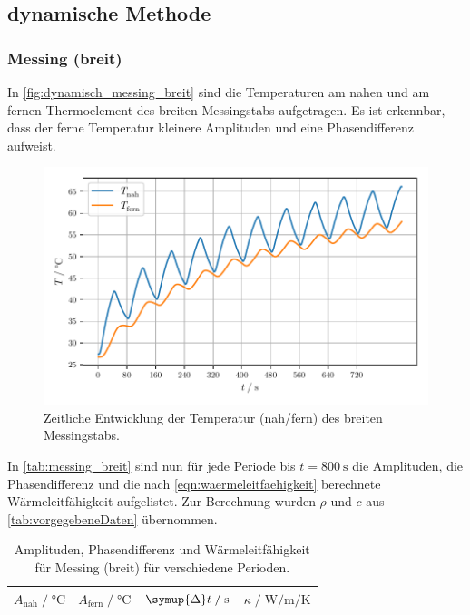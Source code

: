 \subsection{dynamische Methode}
\label{sec:auswertung_dynamisch}

\subsubsection{Messing (breit)}

In \autoref{fig:dynamisch_messing_breit} sind die Temperaturen am nahen und am fernen Thermoelement des breiten Messingstabs aufgetragen.
Es ist erkennbar, dass der ferne Temperatur kleinere Amplituden und eine Phasendifferenz aufweist.

\begin{figure}[H]
  \centering
  \includegraphics{build/plot_dynamisch_messing_breit.pdf}
  \caption{Zeitliche Entwicklung der Temperatur (nah/fern) des breiten Messingstabs.}
  \label{fig:dynamisch_messing_breit}
\end{figure}

In \autoref{tab:messing_breit} sind nun für jede Periode bis $t = \SI{800}{\second}$ die Amplituden, die Phasendifferenz und die nach \autoref{eqn:waermeleitfaehigkeit} berechnete Wärmeleitfähigkeit aufgelistet.
Zur Berechnung wurden $\rho$ und $c$ aus \autoref{tab:vorgegebeneDaten} übernommen.

\begin{table}[H]
     \centering
     \caption{Amplituden, Phasendifferenz und Wärmeleitfähigkeit für Messing (breit) für verschiedene Perioden.}
     \label{tab:messing_breit}
     \begin{tabular}{c c c c}
      \toprule
      $A_\text{nah} \;/\; \si{\celsius}$ &
      $A_\text{fern} \;/\; \si{\celsius}$ &
      $\symup{\Delta}t \;/\; \si{\second}$ &
      $\kappa \;/\; \si{\watt\per\meter\per\kelvin}$ \\
      \midrule
      
      \bottomrule
     \end{tabular}
\end{table}

